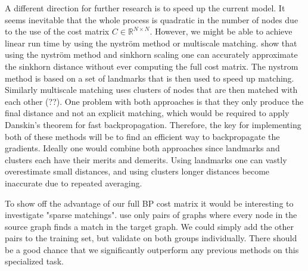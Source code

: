 A different direction for further research is to speed up the current model. It seems inevitable that the whole process is quadratic in the number of nodes due to the use of the cost matrix $C \in \mathbb{R}^{N \times N}$. However, we might be able to achieve linear run time by using the nystr{\"{o}}m method or multiscale matching. \cite{nytrom2019} show that using the nystr{\"{o}}m method and sinkhorn scaling one can accurately approximate the sinkhorn distance without ever computing the full cost matrix. The nystrom method is based on a set of landmarks that is then used to speed up matching. Similarly multiscale matching uses clusters of nodes that are then matched with each other (\citealp{}??). One problem with both approaches is that they only produce the final distance and not an explicit matching, which would be required to apply Danskin's theorem for fast backpropagation. Therefore, the key for implementing both of these methods will be to find an efficient way to backpropagate the gradients. Ideally one would combine both approaches since landmarks and clusters each have their merits and demerits. Using landmarks one can vastly overestimate small distances, and using clusters longer distances become inaccurate due to repeated averaging.

To show off the advantage of our full BP cost matrix it would be interesting to investigate "sparse matchings". \cite{fey2020_update} use only pairs of graphs where every node in the source graph finds a match in the target graph. We could simply add the other pairs to the training set, but validate on both groups individually. There should be a good chance that we significantly outperform any previous methods on this specialized task.
